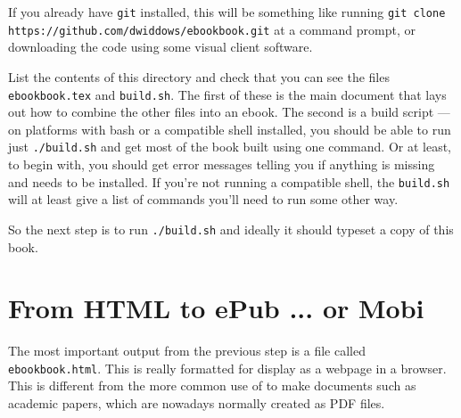 If you already have \texttt{git} installed, this will be something
like running \texttt{git clone
  https://github.com/dwiddows/ebookbook.git} at a command prompt, or
downloading the code using some visual client software. 

List the contents of this directory and check that you can see the
files \texttt{ebookbook.tex} and \texttt{build.sh}. The first of these
is the main \tex document that lays out how to combine the other files
into an ebook.  The second is a build script --- on platforms with
bash or a compatible shell installed, you should be able to run just
\texttt{./build.sh} and get most of the book built using one
command. Or at least, to begin with, you should get error messages
telling you if anything is missing and needs to be installed. If you're not
running a compatible shell, the \texttt{build.sh} will at least give a list
of commands you'll need to run some other way.

So the next step is to run \texttt{./build.sh} and ideally it should
typeset a copy of this book.

\section{From HTML to ePub ... or Mobi}

The most important output from the previous step is a file called \texttt{ebookbook.html}.
This is really formatted for display as a webpage in a browser. This is different
from the more common use of \tex to make documents such as academic papers, which are
nowadays normally created as PDF files.


